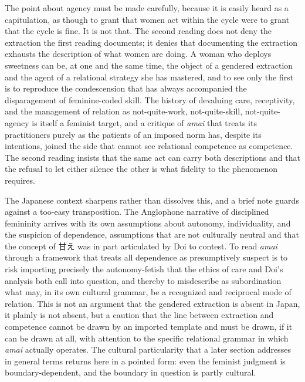 \documentclass[11pt,a4paper]{article}
\newcommand{\cn}[1]{{\cjkfont #1}}
\begin{document}
The point about agency must be made carefully, because it is easily heard as a capitulation, as though to grant that women act within the cycle were to grant that the cycle is fine. It is not that. The second reading does not deny the extraction the first reading documents; it denies that documenting the extraction exhausts the description of what women are doing. A woman who deploys sweetness can be, at one and the same time, the object of a gendered extraction and the agent of a relational strategy she has mastered, and to see only the first is to reproduce the condescension that has always accompanied the disparagement of feminine-coded skill. The history of devaluing care, receptivity, and the management of relation as not-quite-work, not-quite-skill, not-quite-agency is itself a feminist target, and a critique of \textit{amai} that treats its practitioners purely as the patients of an imposed norm has, despite its intentions, joined the side that cannot see relational competence as competence. The second reading insists that the same act can carry both descriptions and that the refusal to let either silence the other is what fidelity to the phenomenon requires.

The Japanese context sharpens rather than dissolves this, and a brief note guards against a too-easy transposition. The Anglophone narrative of disciplined femininity arrives with its own assumptions about autonomy, individuality, and the suspicion of dependence, assumptions that are not culturally neutral and that the concept of \cn{甘え} was in part articulated by Doi to contest. To read \textit{amai} through a framework that treats all dependence as presumptively suspect is to risk importing precisely the autonomy-fetish that the ethics of care and Doi's analysis both call into question, and thereby to misdescribe as subordination what may, in its own cultural grammar, be a recognized and reciprocal mode of relation. This is not an argument that the gendered extraction is absent in Japan, it plainly is not absent, but a caution that the line between extraction and competence cannot be drawn by an imported template and must be drawn, if it can be drawn at all, with attention to the specific relational grammar in which \textit{amai} actually operates. The cultural particularity that a later section addresses in general terms returns here in a pointed form: even the feminist judgment is boundary-dependent, and the boundary in question is partly cultural.
\end{document}
